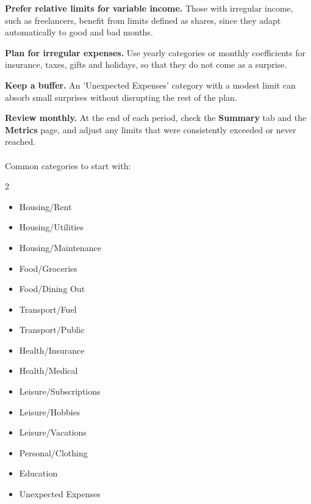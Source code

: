 \noindent \textbf{Prefer relative limits for variable income.} Those with irregular income,
such as freelancers, benefit from limits defined as shares, since they adapt automatically
to good and bad months.

\textbf{Plan for irregular expenses.} Use yearly categories or monthly coefficients
for insurance, taxes, gifts and holidays, so that they do not come as a surprise.

\textbf{Keep a buffer.} An 'Unexpected Expenses' category with a modest limit can
absorb small surprises without disrupting the rest of the plan.

\textbf{Review monthly.} At the end of each period, check the \textbf{Summary} tab
and the \textbf{Metrics} page, and adjust any limits that were consistently exceeded or
never reached.\\
\\

\noindent Common categories to start with:

\begin{multicols}{2}
\begin{itemize}
  \item Housing/Rent
  \item Housing/Utilities
  \item Housing/Maintenance
  \item Food/Groceries
  \item Food/Dining Out
  \item Transport/Fuel
  \item Transport/Public
  \item Health/Insurance
  \item Health/Medical
  \item Leisure/Subscriptions
  \item Leisure/Hobbies
  \item Leisure/Vacations
  \item Personal/Clothing
  \item Education
  \item Unexpected Expenses
\end{itemize}
\end{multicols}
